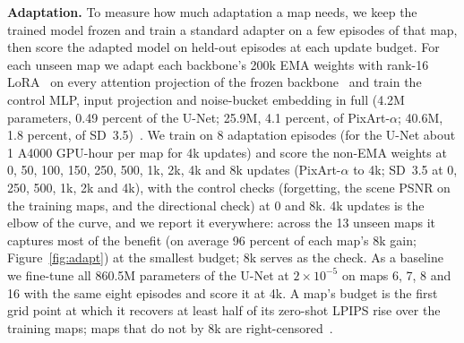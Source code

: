 \textbf{Adaptation.} To measure how much adaptation a map needs, we keep the trained model frozen and train a standard adapter on a few episodes of that map, then score the adapted model on held-out episodes at each update budget.
For each unseen map we adapt each backbone's 200k EMA weights with rank-16 LoRA~\citep{hu2022lora} on every attention projection of the frozen backbone~\citep{gao2024vista} and train the control MLP, input projection and noise-bucket embedding in full (4.2M parameters, 0.49 percent of the U-Net; 25.9M, 4.1 percent, of PixArt-$\alpha$; 40.6M, 1.8 percent, of SD~3.5)~\citep{xie2023difffit}.
We train on 8 adaptation episodes (for the U-Net about 1 A4000 GPU-hour per map for 4k updates) and score the non-EMA weights at 0, 50, 100, 150, 250, 500, 1k, 2k, 4k and 8k updates (PixArt-$\alpha$ to 4k; SD~3.5 at 0, 250, 500, 1k, 2k and 4k), with the control checks (forgetting, the scene PSNR on the training maps, and the directional check) at 0 and 8k. 4k updates is the elbow of the curve, and we report it everywhere: across the 13 unseen maps it captures most of the benefit (on average 96 percent of each map's 8k gain; Figure~\ref{fig:adapt}) at the smallest budget; 8k serves as the check. As a baseline we fine-tune all 860.5M parameters of the U-Net at $2\times10^{-5}$ on maps 6, 7, 8 and 16 with the same eight episodes and score it at 4k.
A map's budget is the first grid point at which it recovers at least half of its zero-shot LPIPS rise over the training maps; maps that do not by 8k are right-censored~\citep{taylor2009transfer}.

